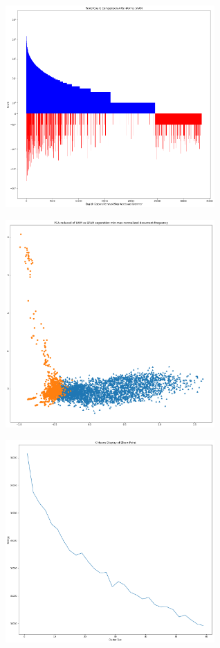 \documentclass[a4paper,11pt]{article}
\begin{document}
\begin{figure}[H]
\centering
\includegraphics[width=8cm]{WordFrequency_ham_vs_spam}
\caption{}
\label{fig-1}
\end{figure}
\begin{figure}[H]
\centering
\includegraphics[width=8cm]{pca_reduction_data}
\caption{}
\label{fig-2}
\end{figure}
\begin{figure}[H]
\centering
\includegraphics[width=8cm]{kmans_elbow}
\caption{}
\label{fig-3}
\end{figure}
\end{document}
